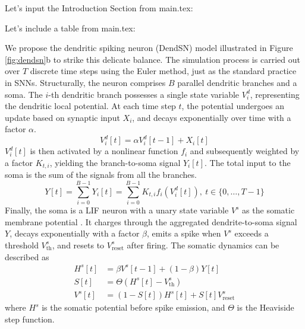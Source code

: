 Let's input the Introduction Section from main.tex:


Let's include a table from main.tex:


We propose the dendritic spiking neuron (DendSN) model illustrated in Figure \ref{fig:dendsn}b to strike this delicate balance. The simulation process is carried out over $T$ discrete time steps using the Euler method, just as the standard practice in SNNs. Structurally, the neuron comprises $B$ parallel dendritic branches and a soma. The $i$-th dendritic branch possesses a single state variable $V_i^d$, representing the dendritic local potential. At each time step $t$, the potential undergoes an update based on synaptic input $X_i$, and decays exponentially over time with a factor $\alpha$. 
\begin{equation}\label{eq:results-dend}
    V_i^d[t] = \alpha V_i^d[t-1] + X_i[t]
\end{equation}
$V_i^d[t]$ is then activated by a nonlinear function $f_i$  and subsequently weighted by a factor $K_{t,i}$, yielding the branch-to-soma signal $Y_i[t]$. The total input to the soma is the sum of the signals from all the branches. 
\begin{equation}\label{eq:results-dend2soma}
    Y[t] = \sum_{i=0}^{B-1}Y_i[t] = \sum_{i=0}^{B-1} K_{t,i} f_i(V_i^d[t]), \ t \in \{0,\dots,T-1\}
\end{equation}
Finally, the soma is a LIF neuron with a unary state variable $V^s$ as the somatic membrane potential \cite{lapicque1907lif}. It charges through the aggregated dendrite-to-soma signal $Y$, decays exponentially with a factor $\beta$, emits a spike when $V^s$ exceeds a threshold $V_{\mathrm{th}}^s$, and resets to $V^{s}_{\mathrm{reset}}$ after firing. The somatic dynamics can be described as
\begin{equation*}\label{eq:results-LIFsoma}
    \begin{aligned}
        H^s[t] &= \beta V^s[t-1] + (1-\beta)Y[t] \\ 
        S[t] &= \Theta(H^s[t] - V^s_{\mathrm{th}}) \\
        V^s[t] &= (1 - S[t])H^s[t] + S[t]V^s_{\mathrm{reset}}
    \end{aligned}
\end{equation*}
where $H^s$ is the somatic potential before spike emission, and $\Theta$ is the Heaviside step function.

